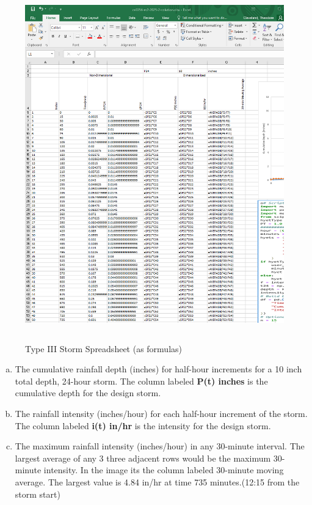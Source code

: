 \documentclass[12pt]{article}
\begin{document}
\begin{enumerate}
\begin{figure}[h!] %
   \centering
   \includegraphics[height=6in]{ES2-6-formulas.png} 
   \caption{Type III Storm Spreadsheet (as formulas)}
   \label{fig:es2-6-form}
\end{figure}
\clearpage

\begin{enumerate}[a)]
        \item The cumulative rainfall depth (inches) for half-hour increments for a 10 inch total depth, 24-hour storm. The column labeled \textbf{P(t) inches} is the cumulative depth for the design storm.
        \item The rainfall intensity (inches/hour) for each half-hour increment of the storm. The column labeled \textbf{i(t) in/hr} is the intensity for the design storm.
        \item The maximum rainfall intensity (inches/hour) in any 30-minute interval.  The largest average of any 3 three adjacent rows would be the maximum 30-minute intensity.  In the image its the column labeled 30-minute moving average.  The largest value is 4.84 in/hr at time 735 minutes.(12:15 from the storm start)
    \end{enumerate}



\end{enumerate}
\end{document}

